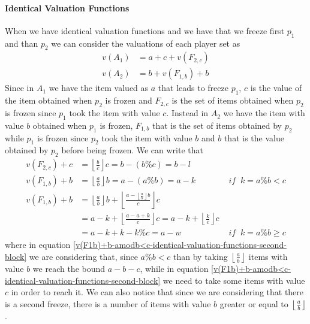 \documentclass{article}
\begin{document}
\paragraph{Identical Valuation Functions}
When we have identical valuation functions and we have that we freeze first $p_1$ and than $p_2$ we can consider the valuations of each player set as 
\begin{align*}
    v(A_1) & = a + c + v(F_{2,c})\\
    v(A_2) & = b + v(F_{1,b}) + b
\end{align*}
Since in $A_1$ we have the item valued as $a$ that leads to freeze $p_1$, $c$ is the value of the item obtained when $p_2$ is frozen and $F_{2,c}$ is the set of items obtained when $p_2$ is frozen since $p_1$ took the item with value $c$. Instead in $A_2$ we have the item with value $b$ obtained when $p_1$ is frozen, $F_{1,b}$ that is the set of items obtained by $p_2$ while $p_1$ is frozen since $p_2$ took the item with value $b$ and $b$ that is the value obtained by $p_2$ before being frozen.
We can write that 
\begin{align}
    v(F_{2,c}) + c &= \left\lfloor \frac{b}{c}\right\rfloor c = b - (b\% c) = b-l \label{v(F2c)+c-identical-valuation-functions-second-block}\\
    v(F_{1,b}) + b &= \left\lfloor \frac{a}{b}\right\rfloor b = a - (a\% b) = a - k  &\textit{ if } \:k = a\% b < c \label{v(F1b)+b-amodb<c-identical-valuation-functions-second-block}\\
    v(F_{1,b}) + b &=\left\lfloor \frac{a}{b}\right\rfloor b + \left\lfloor \frac{a - \left\lfloor \frac{a}{b}\right\rfloor b }{c}\right \rfloor c \label{v(F1b)+b-amodb>c-identical-valuation-functions-second-block} \\&= a-k + \left\lfloor \frac{a- a + k }{c} \right\rfloor c = a - k + \left\lfloor \frac{k}{c}\right\rfloor c \\&= a - k + k - k\% c  = a - w &\textit{ if } \:k = a\% b \ge c
\end{align}
where in equation \ref{v(F1b)+b-amodb<c-identical-valuation-functions-second-block} we are considering that, since $a\% b < c$ than by taking $\left\lfloor\frac{a}{b}\right\rfloor$ items with value $b$ we reach the bound $a-b-c$, while in equation \ref{v(F1b)+b-amodb<c-identical-valuation-functions-second-block} we need to take some items with value $c$ in order to reach it. We can also notice that since we are considering that there is a second freeze, there is a number of items with value $b$ greater or equal to $\left\lfloor\frac{a}{b}\right\rfloor$. 
\end{document}
